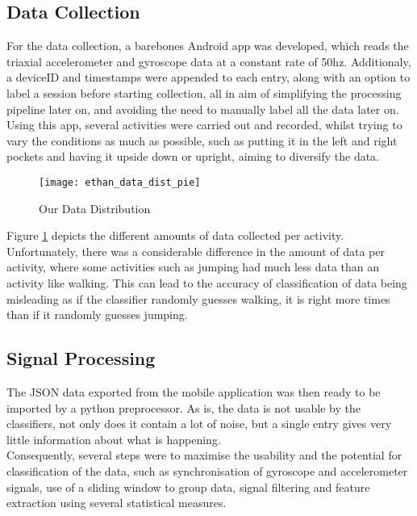 \subsection{Data Collection}
For the data collection, a barebones Android app was developed, which reads the triaxial accelerometer and gyroscope data at a constant rate of 50hz.
Additionaly, a deviceID and timestamps were appended to each entry, along with an option to label a session before starting collection, all in aim of simplifying the processing pipeline later on,
and avoiding the need to manually label all the data later on.\\
Using this app, several activities were carried out and recorded, whilst trying to vary the conditions as much as possible, such as putting it in the left and right pockets and having it upside down or upright, aiming to diversify the data.  
\begin{figure}[ht]
    \centering
    \texttt{[image: ethan\_data\_dist\_pie]}
    \caption{Our Data Distribution}
    \label{our_data_count_dist}
    \end{figure}

Figure \ref{our_data_count_dist} depicts the different amounts of data collected per activity. Unfortunately, there was a considerable difference in the amount of data per activity, where some activities such as jumping had much less data than an activity like walking. This can lead to the accuracy of classification of data being misleading as if the classifier randomly guesses walking, it is right more times than if it randomly guesses jumping. 

\subsection{Signal Processing}
The JSON data exported from the mobile application was then ready to be imported by a python preprocessor. As is, the data is not usable by the classifiers, not only does it contain a lot of noise, but a single entry gives very little information about what is happening.\\
Consequently, several steps were to maximise the usability and the potential for classification of the data, such as synchronisation of gyroscope and accelerometer signals, use of a sliding window to group data, signal filtering and feature extraction using several statistical measures.   

